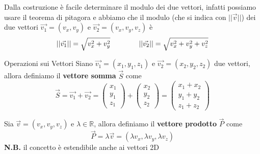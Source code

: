 \documentclass{rapport}
\begin{document}
  Dalla costruzione è facile determinare il modulo dei due vettori, infatti possiamo usare il teorema di pitagora e abbiamo che il modulo (che si indica con $||\vec{v}||$) dei due vettori $\vec{v_1} = (v_x, v_y)$ e $\vec{v_2} = (v_x, v_y, v_z)$ è 
  \[
  \begin{array}{c@{\qquad}@{\qquad}c}
    ||\vec{v_1}|| = \sqrt{v_x^2+v_y^2} & ||\vec{v_2}|| = \sqrt{v_x^2+v_y^2+v_z^2}
  \end{array}
  \]

  \begin{definizione}{Operazioni sui Vettori}{}
    Siano $\vec{v_1}=(x_1, y_1, z_1)$ e $\vec{v_2}=(x_2, y_2, z_2)$ due vettori, allora definiamo il \textbf{vettore somma} $\vec{S}$ come 
    \[
    \vec{S} = \vec{v_1} + \vec{v_2} = \begin{pmatrix}
      x_1\\ y_1\\ z_1
    \end{pmatrix} +\begin{pmatrix}
      x_2\\ y_2\\ z_2
    \end{pmatrix} = \begin{pmatrix}
      x_1+x_2\\ y_1+y_2\\ z_1+z_2
    \end{pmatrix}
    \]
    
    Sia $\vec{v}= (v_x,v_y, v_z)$ e $\lambda \in \mathbb{R}$, allora definiamo il \textbf{vettore prodotto} $\vec{P}$ come
    \[
    \vec{P} = \lambda \vec{v} = 
       (\lambda v_x,  \lambda v_y,  \lambda v_z)
    \] 
    \textbf{N.B.} il concetto è estendibile anche ai vettori 2D
  \end{definizione}
\end{document}
